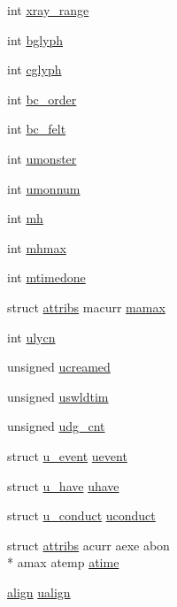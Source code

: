 \begin{DoxyCompactItemize}
\item 
int \hyperlink{structyou_a2f16ef4e943639c15ba3f8a9701267d2}{xray\+\_\+range}
\item 
int \hyperlink{structyou_afb1ab0ddc249cdae37545533aa363c38}{bglyph}
\item 
int \hyperlink{structyou_aa08408f1685acac28ede4200fae7e866}{cglyph}
\item 
int \hyperlink{structyou_acf0adfb1b19b6ae98a85fda17829c994}{bc\+\_\+order}
\item 
int \hyperlink{structyou_a3d3a16319933c6301b41ba9e1ed0fc3e}{bc\+\_\+felt}
\item 
int \hyperlink{structyou_a52b907b7b60827d63d8a2306e3831479}{umonster}
\item 
int \hyperlink{structyou_ae0b7ade89d09cd3b6d5e05eb8c859b35}{umonnum}
\item 
int \hyperlink{structyou_a2106fda1b357aa3395703a3abff426f8}{mh}
\item 
int \hyperlink{structyou_ad0eb213f6299ffa1529fc7864003a044}{mhmax}
\item 
int \hyperlink{structyou_ac0c1bb634638e1b1771035bc45bd5cd7}{mtimedone}
\item 
struct \hyperlink{structattribs}{attribs} macurr \hyperlink{structyou_ae54130d24fb395ade866281e8cb6c8d3}{mamax}
\item 
int \hyperlink{structyou_abe1083af83a3184640fcb451791d2722}{ulycn}
\item 
unsigned \hyperlink{structyou_a8a8bfe7cf93acf5795d7d7fdfbc5ef40}{ucreamed}
\item 
unsigned \hyperlink{structyou_a774f55da1afa57f6bfe3f26908249e35}{uswldtim}
\item 
unsigned \hyperlink{structyou_a57a2b161db463d1534dd5b71e9ff79b6}{udg\+\_\+cnt}
\item 
struct \hyperlink{structu__event}{u\+\_\+event} \hyperlink{structyou_aaa426b9f3053502028edbe45d2031208}{uevent}
\item 
struct \hyperlink{structu__have}{u\+\_\+have} \hyperlink{structyou_a3e83735264e74265e8c8777f73e159fa}{uhave}
\item 
struct \hyperlink{structu__conduct}{u\+\_\+conduct} \hyperlink{structyou_ac34f4744daa7ff78a6ff556ade5b9601}{uconduct}
\item 
struct \hyperlink{structattribs}{attribs} acurr aexe abon \\*
amax atemp \hyperlink{structyou_ad3879d72ecdd6195b3fa399694baded2}{atime}
\item 
\hyperlink{structalign}{align} \hyperlink{structyou_a3f202dd89a837a9772a9eb1f1965f30c}{ualign}

\end{DoxyCompactItemize}
